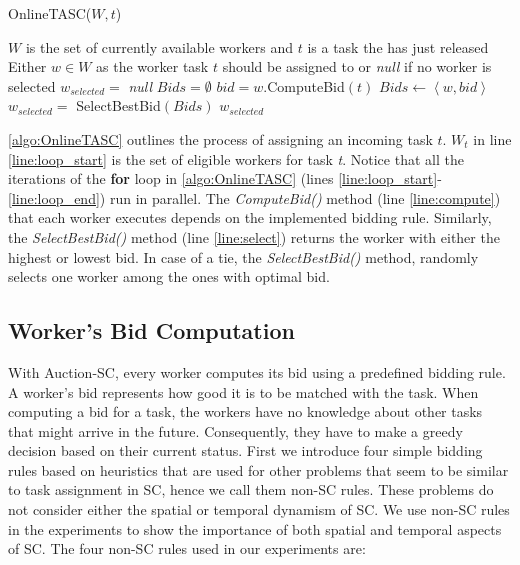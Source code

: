 \begin{algorithm}
\caption{OnlineTASC($W, t$)}
\label{algo:OnlineTASC}
\begin{algorithmic}[1]
\REQUIRE $W$ is the set of currently available workers and $t$ is a task the has just released
\ENSURE Either $w \in W$ as the worker task $t$ should be assigned to or \emph{null} if no worker is selected
\STATE $w_{selected} = $ \emph{null}
\STATE $Bids = \emptyset$
 \label{line:loop_start}
	\STATE $bid = w$.ComputeBid$(t)$ \label{line:compute}
	\STATE $Bids \leftarrow \left\langle w, bid \right\rangle$
\ENDFOR \label{line:loop_end}
\STATE $w_{selected} = $ SelectBestBid$(Bids)$ \label{line:select}
\RETURN $w_{selected}$
\end{algorithmic}
\end{algorithm}

\cref{algo:OnlineTASC} outlines the process of assigning an incoming task $t$. $W_t$ in line \ref{line:loop_start} is the set of eligible workers for task \textit{t}. Notice that all the iterations of the \textbf{for} loop in \cref{algo:OnlineTASC} (lines \ref{line:loop_start}-\ref{line:loop_end}) run in parallel. The \emph{ComputeBid()} method (line \ref{line:compute}) that each worker executes depends on the implemented bidding rule. Similarly, the \emph{SelectBestBid()} method (line \ref{line:select}) returns the worker with either the highest or lowest bid. In case of a tie, the \emph{SelectBestBid()} method, randomly selects one worker among the ones with optimal bid.

\subsection{Worker's Bid Computation}

With Auction-SC, every worker computes its bid using a predefined bidding rule. A worker's bid represents how good it is to be matched with the task. When computing a bid for a task, the workers have no knowledge about other tasks that might arrive in the future. Consequently, they have to make a greedy decision based on their current status. First we introduce four simple bidding rules based on heuristics that are used for other problems that seem to be similar to task assignment in SC, hence we call them non-SC rules. These problems do not consider either the spatial or temporal dynamism of SC. We use non-SC rules in the experiments to show the importance of both spatial and temporal aspects of SC. The four non-SC rules used in our experiments are:

